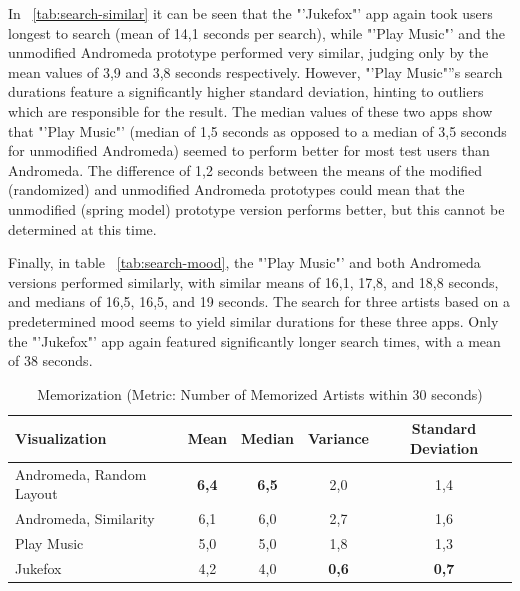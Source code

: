 In ~\ref{tab:search-similar} it can be seen that the "'Jukefox"' app again took users longest to search (mean of 14,1 seconds per search), while "'Play Music"' and the unmodified Andromeda prototype performed very similar, judging only by the mean values of 3,9 and 3,8 seconds respectively. However, "'Play Music"''s search durations feature a significantly higher standard deviation, hinting to outliers which are responsible for the result. The median values of these two apps show that "'Play Music"' (median of 1,5 seconds as opposed to a median of 3,5 seconds for unmodified Andromeda) seemed to perform better for most test users than Andromeda. The difference of 1,2 seconds between the means of the modified (randomized) and unmodified Andromeda prototypes could mean that the unmodified (spring model) prototype version performs better, but this cannot be determined at this time.

Finally, in table ~\ref{tab:search-mood}, the "'Play Music"' and both Andromeda versions performed similarly, with similar means of 16,1, 17,8, and 18,8 seconds, and medians of 16,5, 16,5, and 19 seconds. The search for three artists based on a predetermined mood seems to yield similar durations for these three apps. Only the "'Jukefox"' app again featured significantly longer search times, with a mean of 38 seconds. 
 

\begin{table}[H]
\begin{center}
\begin{tabular}{ | l | c | c | c | c |}
	\hline
	\textbf{Visualization} & \textbf{Mean} & \textbf{Median} & \textbf{Variance} & \textbf{Standard Deviation}\\ \hline
	Andromeda, Random Layout & \textbf{6,4} & \textbf{6,5} & 2,0 & 1,4 \\ \hline
	Andromeda, Similarity & 6,1 & 6,0 & 2,7 & 1,6 \\ \hline
	Play Music & 5,0 & 5,0 & 1,8 & 1,3 \\ \hline
	Jukefox & 4,2 & 4,0 & \textbf{0,6} & \textbf{0,7} \\ \hline
\end{tabular}
\caption {Memorization (Metric: Number of Memorized Artists within 30 seconds)} \label{tab:memorization} 
\end{center}
\end{table}

